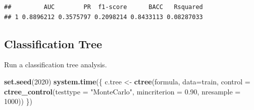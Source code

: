 \documentclass[]{article}
\newenvironment{Shaded}{\begin{snugshade}}{\end{snugshade}}
\newcommand{\DataTypeTok}[1]{\textcolor[rgb]{0.13,0.29,0.53}{#1}}
\newcommand{\DecValTok}[1]{\textcolor[rgb]{0.00,0.00,0.81}{#1}}
\newcommand{\FloatTok}[1]{\textcolor[rgb]{0.00,0.00,0.81}{#1}}
\newcommand{\KeywordTok}[1]{\textcolor[rgb]{0.13,0.29,0.53}{\textbf{#1}}}
\newcommand{\NormalTok}[1]{#1}
\newcommand{\OperatorTok}[1]{\textcolor[rgb]{0.81,0.36,0.00}{\textbf{#1}}}
\newcommand{\StringTok}[1]{\textcolor[rgb]{0.31,0.60,0.02}{#1}}
\begin{document}
\begin{Shaded}
\end{Shaded}

\begin{Shaded}
\end{Shaded}

\begin{verbatim}
##         AUC        PR  f1-score      BACC   Rsquared
## 1 0.8896212 0.3575797 0.2098214 0.8433113 0.08287033
\end{verbatim}

\hypertarget{classification-tree}{%
\subsection{Classification Tree}\label{classification-tree}}

Run a classification tree analysis.

\begin{Shaded}
\begin{Highlighting}[]
\KeywordTok{set.seed}\NormalTok{(}\DecValTok{2020}\NormalTok{)}
\KeywordTok{system.time}\NormalTok{(\{}
\NormalTok{c.tree <-}\StringTok{ }\KeywordTok{ctree}\NormalTok{(formula, }\DataTypeTok{data=}\NormalTok{train,}
               \DataTypeTok{control =} \KeywordTok{ctree_control}\NormalTok{(}\DataTypeTok{testtype =} \StringTok{"MonteCarlo"}\NormalTok{,}
               \DataTypeTok{mincriterion =} \FloatTok{0.90}\NormalTok{, }\DataTypeTok{nresample =} \DecValTok{1000}\NormalTok{))}
\NormalTok{\})}
\end{Highlighting}
\end{Shaded}
\end{document}
